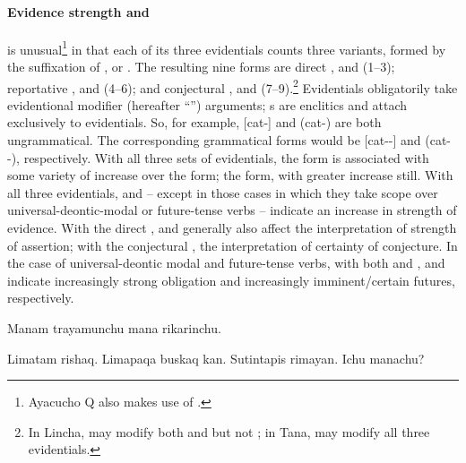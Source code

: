 \paragraph{Evidence strength  and }\label{par:evistre}
\SYQ{} is unusual\footnote{Ayacucho Q also makes use of .} in that each of its three evidentials counts three variants, formed by the suffixation of \phono{-\uo},  or . The resulting nine forms are direct ,  and (1--3); reportative ,  and  (4--6); and conjectural ,  and (7--9).\footnote{In Lincha,  may modify both  and  but not ; in Tana,  may modify all three evidentials.} Evidentials obligatorily take evidentional modifier (hereafter ``'') arguments; s are enclitics and attach exclusively to evidentials. So, for example,  [cat-] and  (cat-) are both ungrammatical. The corresponding grammatical forms would be  [cat--\uo] and  (cat--), respectively. With all three sets of evidentials, the  form is associated with some variety of increase over the \phono{-\uo{}} form; the  form, with greater increase still. With all three evidentials,  and  -- except in those cases in which they take scope over universal-deontic-modal or future-tense verbs -- indicate an increase in strength of evidence. With the direct ,  and  generally also affect the interpretation of strength of assertion; with the conjectural , the interpretation of certainty of conjecture. In the case of universal-deontic modal and future-tense verbs, with both  and ,  and  indicate increasingly strong obligation and increasingly imminent/certain futures, respectively.

%
{Manam trayamunchu mana rikarinchu.}%
{}%
{}{}%

%
{Limatam rishaq. Limapaqa buskaq kan. Sutintapis rimayan. \textquestiondown{}Ichu manachu?}%
{}%
{}{}%

